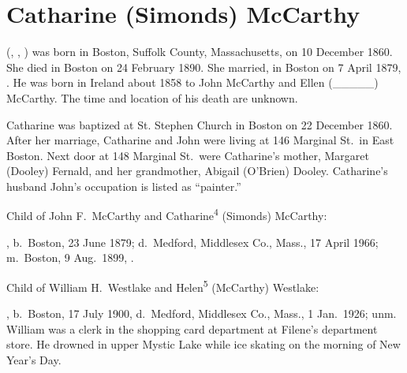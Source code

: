 \section{Catharine (Simonds) McCarthy}

 (, , ) was born in Boston, Suffolk County, Massachusetts, on 10 December 1860.\cite{Catharine4SimondsBirth} She died in Boston on 24 February 1890.\cite{Catharine4SimondsDeath} She married, in Boston on 7 April 1879, .\cite{JohnMcCarthyMarriage} He was born in Ireland about 1858 to John McCarthy and Ellen (\_\_\_\_\_) McCarthy.\cite{JohnMcCarthyMarriage} The time and location of his death are unknown.

Catharine was baptized at St. Stephen Church in Boston on 22 December 1860.\cite{Catharine4SimondsBaptism} After her marriage, Catharine and John were living at 146 Marginal St.\ in East Boston. Next door at 148 Marginal St.\ were Catharine's mother, Margaret (Dooley) Fernald, and her grandmother, Abigail (O'Brien) Dooley. Catharine's husband John's occupation is listed as ``painter.''\cite{Census1880Catharine4Simonds}

\begin{KidsIntro}
	Child of John F.\ McCarthy and Catharine\textsuperscript{4} (Simonds) McCarthy:
\end{KidsIntro}

\begin{Kids}
	, b.\ Boston, 23 June 1879;\cite{Helen5McCarthyBirth} d.\ Medford, Middlesex Co., Mass., 17 April 1966;\cite{Helen5McCarthyDeath} m.\ Boston, 9 Aug.\ 1899, .\cite{Helen5McCarthyMarriage}

\begin{GrandkidsIntro}
	Child of William H.\ Westlake and Helen\textsuperscript{5} (McCarthy) Westlake:
\end{GrandkidsIntro}

\begin{Grandkids}		
	, b.\ Boston, 17 July 1900,\cite{William5WestlakeBirth} d.\ Medford, Middlesex Co., Mass., 1 Jan.\ 1926; unm.\cite{William5WestlakeDeath} William was a clerk in the shopping card department at Filene's department store. He drowned in upper Mystic Lake while ice skating on the morning of New Year's Day.\cite{William5WestlakeDeath}
\end{Grandkids}

\end{Kids}



